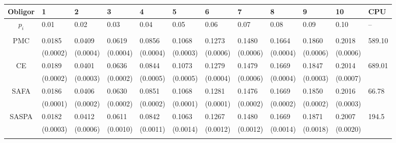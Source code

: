 \documentclass{article}
\newcommand{\VaRC}{\text{VaRC}}
\begin{document}
\begin{table}[p]
\centering
\footnotesize
\begin{threeparttable}
\begin{tabularx}{\textwidth}{@{}c*{10}{Y}Y@{}}
\toprule
Obligor    & 1 & 2 & 3 & 4 & 5 & 6 & 7 & 8 & 9 & 10 & CPU\tnote{*} \\
\midrule
$p_i$      & 0.01 & 0.02 & 0.03 & 0.04 & 0.05 & 0.06 & 0.07 & 0.08 & 0.09 & 0.10 & -- \\
\addlinespace[2pt]

\multicolumn{12}{@{}l}{$\VaRC_{0.95}$}\\
\cmidrule(lr){1-1}
PMC        & 0.0185 & 0.0409 & 0.0619 & 0.0856 & 0.1068 & 0.1273 & 0.1480 & 0.1664 & 0.1860 & 0.2018 & 589.10 \\
           & (0.0002) & (0.0004) & (0.0004) & (0.0004) & (0.0003) & (0.0006) & (0.0006) & (0.0004) & (0.0006) & (0.0006) & \\
CE         & 0.0189 & 0.0401 & 0.0636 & 0.0844 & 0.1073 & 0.1279 & 0.1479 & 0.1669 & 0.1847 & 0.2014 & 689.01 \\ %
           & (0.0002) & (0.0003) & (0.0002) & (0.0005) & (0.0005) & (0.0004) & (0.0006) & (0.0004) & (0.0003) & (0.0007) & \\
SAFA       & 0.0186 & 0.0406 & 0.0630 & 0.0851 & 0.1068 & 0.1281 & 0.1476 & 0.1669 & 0.1850 & 0.2016 & 66.78 \\
           & (0.0001) & (0.0002) & (0.0002) & (0.0002) & (0.0001) & (0.0001) & (0.0002) & (0.0002) & (0.0002) & (0.0003) & \\
SASPA      & 0.0182 & 0.0412 & 0.0611 & 0.0842 & 0.1063 & 0.1267 & 0.1480 & 0.1669 & 0.1871 & 0.2007 & 194.5 \\
           & (0.0003) & (0.0006) & (0.0010) & (0.0011) & (0.0014) & (0.0012) & (0.0012) & (0.0014) & (0.0018) & (0.0020) & \\
\addlinespace[2pt]


\end{tabularx}
\end{threeparttable}
\end{table}
\end{document}
